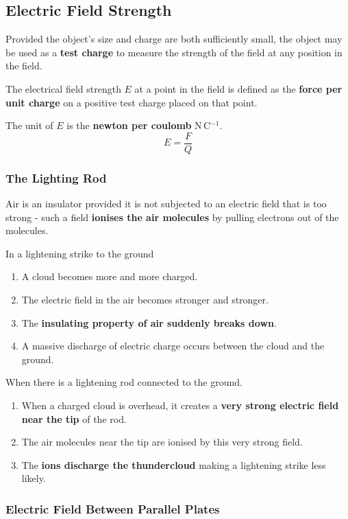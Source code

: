 \subsection{Electric Field Strength}

Provided the object's size and charge are both sufficiently small, the object may be used as a \textbf{test charge} to measure the strength of the field at any position in the field.

The electrical field strength $E$ at a point in the field is defined as the \textbf{force per unit charge} on a positive test charge placed on that point.

The unit of $E$ is the \textbf{newton per coulomb} N\,C$^{-1}$.
$$E=\frac{F}{Q}$$

\subsubsection*{The Lighting Rod}

Air is an insulator provided it is not subjected to an electric field that is too strong - such a field \textbf{ionises the air molecules} by pulling electrons out of the molecules.

In a lightening strike to the ground
\begin{enumerate}
    \item A cloud becomes more and more charged.
    \item The electric field in the air becomes stronger and stronger.
    \item The \textbf{insulating property of air suddenly breaks down}.
    \item A massive discharge of electric charge occurs between the cloud and the ground.
\end{enumerate}

When there is a lightening rod connected to the ground.
\begin{enumerate}
    \item When a charged cloud is overhead, it creates a \textbf{very strong electric field near the tip} of the rod.
    \item The air molecules near the tip are ionised by this very strong field.
    \item The \textbf{ions discharge the thundercloud} making a lightening strike less likely.
\end{enumerate}

\subsubsection*{Electric Field Between Parallel Plates}

